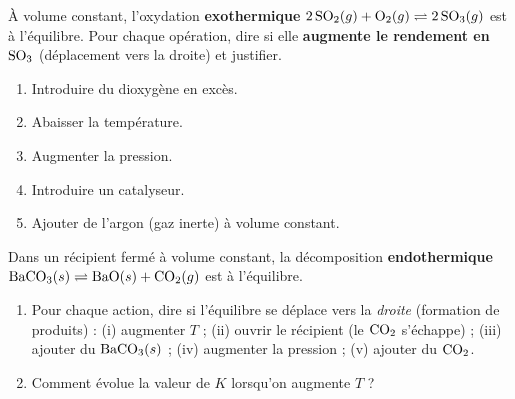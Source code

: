 \documentclass[11pt,a4paper]{article}
\begin{document}
\begin{exercice}
À volume constant, l'oxydation \textbf{exothermique} \;$2\,\ce{SO2}(g) + \ce{O2}(g) \rightleftharpoons 2\,\ce{SO3}(g)$\;
est à l'équilibre. Pour chaque opération, dire si elle \textbf{augmente le rendement en $\ce{SO3}$}
(déplacement vers la droite) et justifier.
\begin{enumerate}[label=\alph*),leftmargin=2em,topsep=2pt,itemsep=2pt]
  \item Introduire du dioxygène en excès.
  \item Abaisser la température.
  \item Augmenter la pression.
  \item Introduire un catalyseur.
  \item Ajouter de l'argon (gaz inerte) à volume constant.
\end{enumerate}
\end{exercice}

\begin{exercice}
Dans un récipient fermé à volume constant, la décomposition \textbf{endothermique}
\;$\ce{BaCO3}(s) \rightleftharpoons \ce{BaO}(s) + \ce{CO2}(g)$\; est à l'équilibre.
\begin{enumerate}[label=\alph*),leftmargin=2em,topsep=2pt,itemsep=2pt]
  \item Pour chaque action, dire si l'équilibre se déplace vers la \emph{droite} (formation de produits) :
        (i) augmenter $T$ ; (ii) ouvrir le récipient (le $\ce{CO2}$ s'échappe) ; (iii) ajouter du
        $\ce{BaCO3}(s)$ ; (iv) augmenter la pression ; (v) ajouter du $\ce{CO2}$.
  \item Comment évolue la valeur de $K$ lorsqu'on augmente $T$ ?
\end{enumerate}
\end{exercice}
\end{document}
